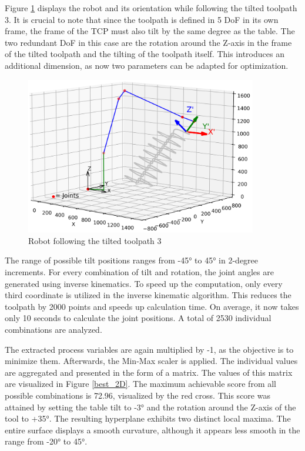 Figure \ref{TP3_25_robot} displays the robot and its orientation while following the tilted toolpath 3. It is crucial to note that since the toolpath is defined in 5 \acrshort{DoF} in its own frame, the frame of the \acrshort{TCP} must also tilt by the same degree as the table. The two redundant \acrshort{DoF} in this case are the rotation around the Z-axis in the frame of the tilted toolpath and the tilting of the toolpath itself. This introduces an additional dimension, as now two parameters can be adapted for optimization.


\begin{figure}[H]
	\centerline{\includegraphics[width=0.9\textwidth]{figures/robotANDpath3_45.png}}
	\caption{Robot following the tilted toolpath 3}
	\label{TP3_25_robot}
\end{figure}

The range of possible tilt positions ranges from -45° to 45° in 2-degree increments. For every combination of tilt and rotation, the joint angles are generated using inverse kinematics. To speed up the computation, only every third coordinate is utilized in the inverse kinematic algorithm. This reduces the toolpath by 2000 points and speeds up calculation time. On average, it now takes only 10 seconds to calculate the joint positions. A total of 2530 individual combinations are analyzed.

The extracted process variables are again multiplied by -1, as the objective is to minimize them. Afterwards, the Min-Max scaler is applied. The individual values are aggregated and presented in the form of a matrix. The values of this matrix are visualized in Figure \ref{best_2D}. The maximum achievable score from all possible combinations is 72.96, visualized by the red cross. This score was attained by setting the table tilt to -3° and the rotation around the Z-axis of the tool to +35°. The resulting hyperplane exhibits two distinct local maxima. The entire surface displays a smooth curvature, although it appears less smooth in the range from -20° to 45°.


